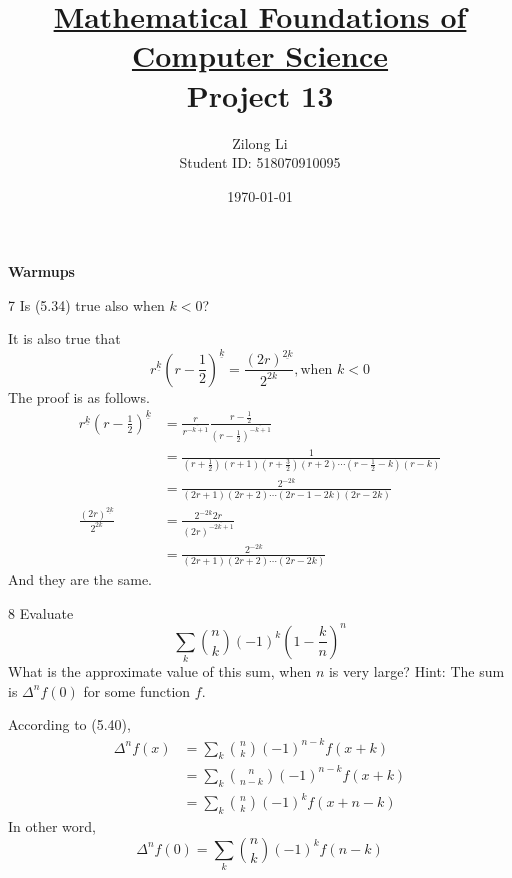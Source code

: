 \documentclass[a4paper,12pt]{article}
\title{\small \underline{Mathematical Foundations of Computer Science}\\\Large Project 13}
\author{Zilong Li\\\small Student ID: 518070910095}
\date{\today}
\makeatletter
\newtheorem*{solution}{Solution}
\theoremstyle{definition}
\renewenvironment{solution}[1][Solution] {\par\pushQED{\qed}\normalfont\topsep6\p@\@plus6\p@\relax\trivlist\item[\hskip\labelsep\bfseries#1\@addpunct{.}]\ignorespaces}{\popQED\endtrivlist\@endpefalse} \makeatother
\newenvironment{problems}{\begin{list}{}{\renewcommand{\makelabel}[1]{\textbf{##1}\hfil}}}{\end{list}}
\makeatother
\begin{document}
\maketitle

\noindent\textbf{Warmups}

\begin{problems}
   \item[7]Is (5.34) true also when $k < 0$?
   \begin{solution}
        It is also true that 
        \begin{equation*}
            r^{\underline{k}}\left(r-\frac{1}{2}\right)^{\underline{k}}= \frac{(2r)^{\underline{2k}}}{2^{2k}}, \text{when } k<0
        \end{equation*}
        The proof is as follows.
        \begin{align*}
            r^{\underline{k}}\left(r-\frac{1}{2}\right)^{\underline{k}} &= \frac{r}{r^{\overline{-k+1}}}\frac{r-\frac{1}{2}}{\left(r-\frac{1}{2}\right)^{\overline{-k+1}}} \\
            &= \frac{1}{(r+\frac{1}{2})(r+1)(r+\frac{3}{2})(r+2)\cdots(r-\frac{1}{2}-k)(r-k)} \\
            &= \frac{2^{-2k}}{(2r+1)(2r+2)\cdots(2r-1-2k)(2r-2k)}\\
            \frac{(2r)^{\underline{2k}}}{2^{2k}} &= \frac{2^{-2k}2r}{(2r)^{\overline{-2k+1}}}\\ 
            &= \frac{2^{-2k}}{(2r+1)(2r+2)\cdots(2r-2k)}
        \end{align*}
        And they are the same.
   \end{solution}
   \item[8]Evaluate 
   \begin{equation*}
       \sum_k\binom{n}{k}(-1)^k\left(1-\frac{k}{n}\right)^n
   \end{equation*}
   What is the approximate value of this sum, when $n$ is very large? Hint: The sum is $\Delta^n f(0)$ for some function $f$.
   \begin{solution}
       According to (5.40),
       \begin{align*}
           \Delta^n f(x) &= \sum_k\binom{n}{k}(-1)^{n-k}f(x+k) \\&=\sum_k\binom{n}{n-k}(-1)^{n-k}f(x+k)\\ &= \sum_k\binom{n}{k}(-1)^{k}f(x+n-k)
       \end{align*}
       In other word,
       \begin{equation*}
        \Delta^n f(0)  = \sum_k\binom{n}{k}(-1)^{k}f(n-k)

\end{equation*}
\end{solution}
\end{problems}
\end{document}
